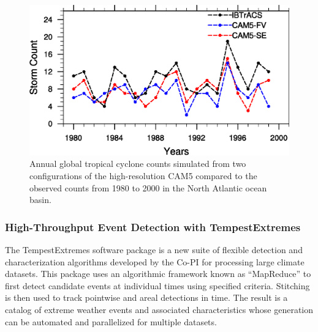 \documentclass[11pt]{article}
\begin{document}
\begin{figure}[h]
\begin{center}
\includegraphics[width=5.in]{NA_interannual.eps}
\end{center}
\caption{Annual global tropical cyclone counts simulated from two configurations of the high-resolution CAM5 compared to the observed counts from 1980 to 2000 in the North Atlantic ocean basin.} \label{fig:NATCs}
\end{figure}

\subsubsection{High-Throughput Event Detection with TempestExtremes} \label{sec:TempestExtremes}

The TempestExtremes software package is a new suite of flexible detection and characterization algorithms developed by the Co-PI for processing large climate datasets. This package uses an algorithmic framework known as ``MapReduce'' to first detect candidate events at individual times using specified criteria. Stitching is then used to track pointwise and areal detections in time. The result is a catalog of extreme weather events and associated characteristics whose generation can be automated and parallelized for multiple datasets.
\end{document}
